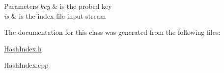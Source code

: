 \begin{DoxyParams}{Parameters}
{\em key} & is the probed key \\
\hline
{\em is} & is the index file input stream \\
\hline
\end{DoxyParams}


The documentation for this class was generated from the following files\+:\begin{DoxyCompactItemize}
\item 
\hyperlink{_hash_index_8h}{Hash\+Index.\+h}\item 
Hash\+Index.\+cpp\end{DoxyCompactItemize}
